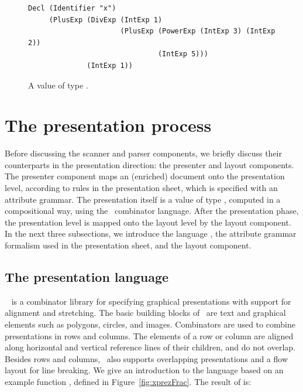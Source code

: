 \documentclass[12pt]{article}
\begin{document}
\begin{figure}
\begin{center}
\begin{footnotesize}
\begin{verbatim}
Decl (Identifier "x") 
     (PlusExp (DivExp (IntExp 1)
                      (PlusExp (PowerExp (IntExp 3) (IntExp 2))
                               (IntExp 5)))
              (IntExp 1))
\end{verbatim}
\end{footnotesize}
\end{center}
\caption{A value of type .} \label{fig:valueExample} 
\end{figure}







%
\section{The presentation process}\label{sect:presentationProcess}
%

Before discussing the scanner and parser components, we briefly discuss their counterparts in the presentation direction: the presenter and layout components. The presenter component maps an (enriched) document onto the presentation level, according to rules in the presentation sheet, which is specified with an attribute grammar. The presentation itself is a value of type , computed in a compositional way, using the\  combinator language. After the presentation phase, the presentation level is mapped onto the layout level by the layout component. In the next three subsections, we introduce the language \Xprez, the attribute grammar formalism used in the presentation sheet, and the layout component.

\subsection{The {\Xprez} presentation language} \label{sect:xprez}

\Xprez~\cite{schrage04Proxima} is a combinator library for specifying graphical presentations with support for alignment and stretching.  The basic building blocks of \Xprez\ are text and graphical elements such as polygons, circles, and images. Combinators are used to combine presentations in rows and columns. The elements of a row or column are aligned along horizontal and vertical reference lines of their children, and do not overlap. Besides rows and columns, \Xprez\ also supports overlapping presentations and a flow layout for line breaking. We give an introduction to the language based on an example function , defined in Figure~\ref{fig:xprezFrac}. The result of  is:
\end{document}
